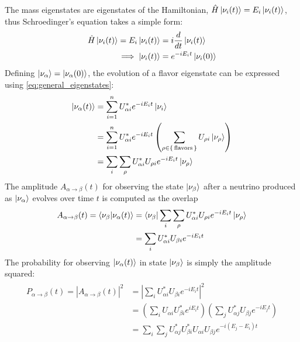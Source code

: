 The mass eigenstates are eigenstates of the Hamiltonian,
$\hat{H}\ket{\nu_i(t)} = E_i\ket{\nu_i(t)}$,
thus Schroedinger's equation takes a simple form:
\begin{align}\label{eq:schroedinger}
    \begin{split}
        \hat{H}\ket{\nu_i(t)} = E_i\ket{\nu_i(t)} &= i\frac{d}{dt}\ket{\nu_i(t)} \\
        \implies \ket{\nu_i(t)} &= e^{-iE_it}\ket{\nu_i(0)}
    \end{split}
\end{align}
Defining $\ket{\nu_\alpha} = \ket{\nu_\alpha(0)}$,
the evolution of a flavor eigenstate can be expressed
using \cref{eq:general_eigenstates}:
\begin{align}\label{eq:state_evolution}
    \begin{split}
        \ket{\nu_\alpha(t)}
        &= \sum_{i=1}^n U^*_{\alpha i} e^{-iE_it}\ket{\nu_i} \\
        &= \sum_{i=1}^nU^*_{\alpha i} e^{-iE_it}
        \left(\sum_{\rho\in\set{\text{flavors}}} U_{\rho i} \ket{\nu_\rho}\right) \\
        &= \sum_i\sum_\rho U^*_{\alpha i} U_{\rho i} e^{-iE_it}\ket{\nu_\rho}
    \end{split}
\end{align}
The amplitude $A_{\alpha\to\beta}(t)$
for observing the state $\ket{\nu_\beta}$ after
a neutrino produced as $\ket{\nu_\alpha}$ evolves over time $t$
is computed as the overlap
\begin{align}\label{eq:osc_amplitude}
    \begin{split}
        A_{\alpha\to\beta}(t) = \braket{\nu_\beta | \nu_\alpha(t)}
        &= \bra{\nu_\beta} \sum_i\sum_\rho U^*_{\alpha i} U_{\rho i}
        e^{-iE_it}\ket{\nu_\rho} \\
        &= \sum_i U^*_{\alpha i} U_{\beta i} e^{-iE_it} \\
    \end{split}
\end{align}
The probability for observing $\ket{\nu_\alpha(t)}$ in state $\ket{\nu_\beta}$
is simply the amplitude squared:
\begin{align}\label{eq:oscprob_general}
    \begin{split}
        P_{\alpha\to\beta}(t) = \left|A_{\alpha\to\beta}(t)\right|^2
        &= \left|\sum_i U^*_{\alpha i} U_{\beta i} e^{-iE_it}\right|^2 \\
        &= \left(\sum_iU_{\alpha i} U^*_{\beta i} e^{iE_it}\right)
        \left(\sum_j U^*_{\alpha j} U_{\beta j} e^{-iE_jt}\right) \\
        &= \sum_i\sum_j U^*_{\alpha j} U^*_{\beta i} U_{\alpha i} U_{\beta j}
        e^{-i(E_j - E_i)t}
    \end{split}
\end{align}
